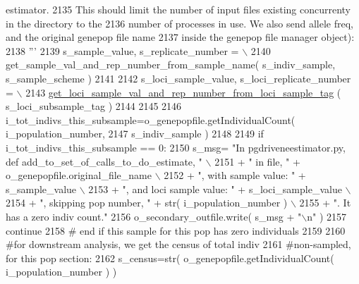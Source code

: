 \begin{DoxyCode}
{       estimator.}
2135 \textcolor{stringliteral}{                This should limit the number of input files existing concurrenty in the directory to the }
2136 \textcolor{stringliteral}{                number of processes in use.  We also send allele freq, and the original genepop file name }
2137 \textcolor{stringliteral}{                inside the genepop file manager object):}
2138 \textcolor{stringliteral}{                '''}
2139                 s\_sample\_value, s\_replicate\_number = \(\backslash\)
2140                         get\_sample\_val\_and\_rep\_number\_from\_sample\_name( s\_indiv\_sample, s\_sample\_scheme )
2141 
2142                 s\_loci\_sample\_value, s\_loci\_replicate\_number = \(\backslash\)
2143                         \hyperlink{namespacenegui_1_1pgdriveneestimator_ac6e046ac333dcd975329026d752ea2d9}{get\_loci\_sample\_val\_and\_rep\_number\_from\_loci\_sample\_tag}
      ( s\_loci\_subsample\_tag )
2144                 
2145 
2146                 i\_tot\_indivs\_this\_subsample=o\_genepopfile.getIndividualCount( i\_population\_number, 
2147                                                                                         s\_indiv\_sample )
2148 
2149                 \textcolor{keywordflow}{if} i\_tot\_indivs\_this\_subsample == 0:
2150                     s\_msg= \textcolor{stringliteral}{"In pgdriveneestimator.py, def add\_to\_set\_of\_calls\_to\_do\_estimate, "} \(\backslash\)
2151                                     + \textcolor{stringliteral}{" in file, "} + o\_genepopfile.original\_file\_name \(\backslash\)
2152                                     + \textcolor{stringliteral}{", with sample value: "} + s\_sample\_value \(\backslash\)
2153                                     + \textcolor{stringliteral}{", and loci sample value: "} + s\_loci\_sample\_value \(\backslash\)
2154                                     + \textcolor{stringliteral}{", skipping pop number, "}  + str( i\_population\_number ) \(\backslash\)
2155                                     + \textcolor{stringliteral}{".  It has a zero indiv count."}
2156                     o\_secondary\_outfile.write( s\_msg + \textcolor{stringliteral}{"\(\backslash\)n"} )
2157                     \textcolor{keywordflow}{continue}
2158                 \textcolor{comment}{# end if this sample for this pop has zero individuals}
2159 
2160                 \textcolor{comment}{#for downstream analysis, we get the census of total indiv}
2161                 \textcolor{comment}{#non-sampled, for this pop section:}
2162                 s\_census=str( o\_genepopfile.getIndividualCount( i\_population\_number ) )

\end{DoxyCode}
